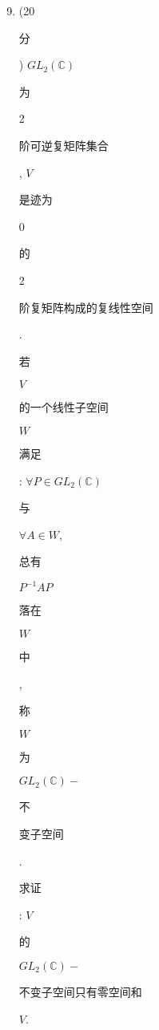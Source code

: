 \documentclass[10pt]{article}
\begin{document}
\begin{enumerate}
  \setcounter{enumi}{8}
  \item (20 \begin{CJK}{UTF8}{mj}分\end{CJK}) $G L_{2}(\mathbb{C})$ \begin{CJK}{UTF8}{mj}为\end{CJK} 2 \begin{CJK}{UTF8}{mj}阶可逆复矩阵集合\end{CJK}, $V$ \begin{CJK}{UTF8}{mj}是迹为\end{CJK} 0 \begin{CJK}{UTF8}{mj}的\end{CJK} 2 \begin{CJK}{UTF8}{mj}阶复矩阵构成的复线性空间\end{CJK}. \begin{CJK}{UTF8}{mj}若\end{CJK} $V$ \begin{CJK}{UTF8}{mj}的一个线性子空间\end{CJK} $W$ \begin{CJK}{UTF8}{mj}满足\end{CJK}: $\forall P \in G L_{2}(\mathbb{C})$ \begin{CJK}{UTF8}{mj}与\end{CJK} $\forall A \in W$, \begin{CJK}{UTF8}{mj}总有\end{CJK} $P^{-1} A P$ \begin{CJK}{UTF8}{mj}落在\end{CJK} $W$ \begin{CJK}{UTF8}{mj}中\end{CJK}, \begin{CJK}{UTF8}{mj}称\end{CJK} $W$ \begin{CJK}{UTF8}{mj}为\end{CJK} $G L_{2}(\mathbb{C})-$ \begin{CJK}{UTF8}{mj}不\end{CJK} \begin{CJK}{UTF8}{mj}变子空间\end{CJK}. \begin{CJK}{UTF8}{mj}求证\end{CJK}: $V$ \begin{CJK}{UTF8}{mj}的\end{CJK} $G L_{2}(\mathbb{C})-$ \begin{CJK}{UTF8}{mj}不变子空间只有零空间和\end{CJK} $V$.
\end{enumerate}
\end{document}
